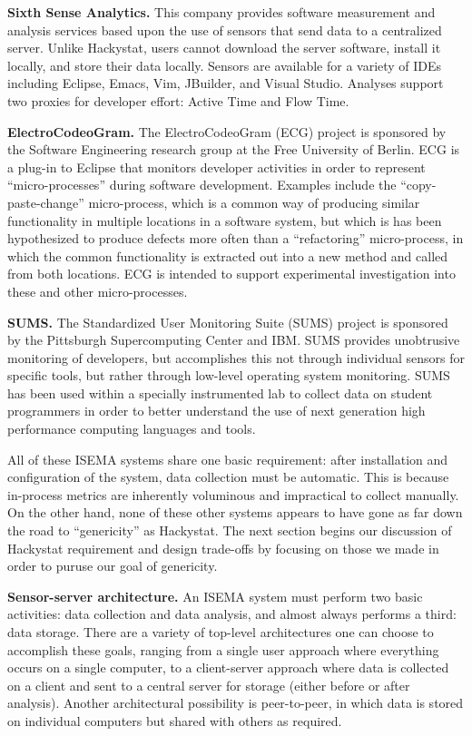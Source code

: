 \documentclass[10pt,twocolumn]{article}
\begin{document}
{\bf Sixth Sense Analytics.} This company \cite{SixthSenseAnalytics}
provides software measurement and analysis services based upon the use of
sensors that send data to a centralized server.  Unlike Hackystat, users
cannot download the server software, install it locally, and store their
data locally. Sensors are available for a variety of IDEs including
Eclipse, Emacs, Vim, JBuilder, and Visual Studio. Analyses support two
proxies for developer effort: Active Time and Flow Time. 

{\bf ElectroCodeoGram.}  The ElectroCodeoGram (ECG) project \cite{ECG} is
sponsored by the Software Engineering research group at the Free University
of Berlin. ECG is a plug-in to Eclipse that monitors developer activities
in order to represent ``micro-processes'' during software development.
Examples include the ``copy-paste-change'' micro-process, which is a common
way of producing similar functionality in multiple locations in a software
system, but which is has been hypothesized to produce defects more often
than a ``refactoring'' micro-process, in which the common functionality is
extracted out into a new method and called from both locations.  ECG is
intended to support experimental investigation into these and other
micro-processes.

 {\bf SUMS.} The Standardized User Monitoring Suite (SUMS) project
\cite{SUMS} is sponsored by the Pittsburgh Supercomputing Center and IBM.
SUMS provides unobtrusive monitoring of developers, but accomplishes this
not through individual sensors for specific tools, but rather through
low-level operating system monitoring.  SUMS has been used within a
specially instrumented lab to collect data on student programmers in order
to better understand the use of next generation high performance computing
languages and tools.

All of these ISEMA systems share one basic requirement: after installation
and configuration of the system, data collection must be automatic. This is
because in-process metrics are inherently voluminous and impractical to
collect manually.  On the other hand, none of these other systems appears
to have gone as far down the road to ``genericity'' as Hackystat.  The next
section begins our discussion of Hackystat requirement and 
design trade-offs by focusing on those we made in order to puruse our 
goal of genericity.


{\bf Sensor-server architecture.} An ISEMA system must perform two basic
activities: data collection and data analysis, and almost always performs
a third: data storage.  There are a variety of top-level architectures one
can choose to accomplish these goals, ranging from a single user approach where
everything occurs on a single computer, to a client-server approach where data
is collected on a client and sent to a central server for storage (either before
or after analysis).  Another architectural possibility is peer-to-peer, in which 
data is stored on individual computers but shared with others as required. 
\end{document}
